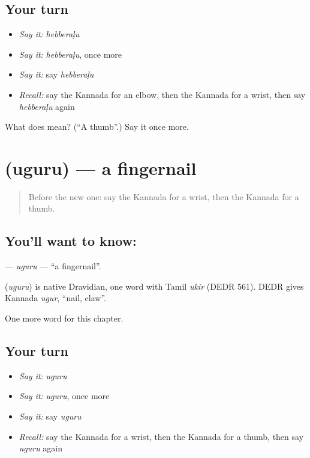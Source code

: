 \subsection*{Your turn}
\begin{itemize}
\raggedright
  \item \emph{Say it:} \emph{hebberaḷu}
  \item \emph{Say it:} \emph{hebberaḷu}, once more
  \item \emph{Say it:} say \emph{hebberaḷu}
  \item \emph{Recall:} say the Kannada for an elbow, then the Kannada for a wrist, then say \emph{hebberaḷu} again
\end{itemize}

\begin{tcolorbox}[breakable,colback=teal!4,colframe=teal!35!black,title={Before you move on}]
What does  mean? (\textquotedblleft{}A thumb\textquotedblright{}.) Say it once more.
\end{tcolorbox}
\section[\texorpdfstring{\kn{ಉಗುರು} (uguru)}{ಉಗುರು (uguru)}]{ (uguru) — a fingernail}

\label{lesson:KA-C136-uguru}



\begin{quote}
Before the new one: say the Kannada for a wrist, then the Kannada for a thumb.
\end{quote}

\subsection*{You'll want to know: }
\textbf{} — \emph{uguru} — \textquotedblleft{}a fingernail\textquotedblright{}.

\begin{cousinweb}
\textbf{} (\emph{uguru}) is native Dravidian, one word with Tamil \emph{ukir} (DEDR 561). DEDR gives Kannada \emph{ugur}, \textquotedblleft{}nail, claw\textquotedblright{}.
\end{cousinweb}

\begin{grammarlens}[title={What you've built}]
One more word for this chapter.
\end{grammarlens}

\subsection*{Your turn}
\begin{itemize}
\raggedright
  \item \emph{Say it:} \emph{uguru}
  \item \emph{Say it:} \emph{uguru}, once more
  \item \emph{Say it:} say \emph{uguru}
  \item \emph{Recall:} say the Kannada for a wrist, then the Kannada for a thumb, then say \emph{uguru} again
\end{itemize}

